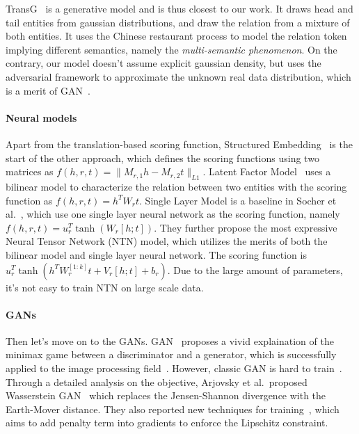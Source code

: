 \documentclass[twocolumn,a4paper,10pt,preprint,3p]{elsarticle}
\begin{document}
TransG~\cite{TransG} is a generative model and is thus closest to our work. It draws head and tail entities from gaussian distributions, and draw the relation from a mixture of both entities. It uses the Chinese restaurant process to model the relation token implying different semantics, namely the \emph{multi-semantic phenomenon}.
On the contrary, our model doesn't assume explicit gaussian density, but uses the adversarial framework to approximate the unknown real data distribution, which is a merit of GAN~\cite{Goodfellow_2016}.

\paragraph{Neural models} Apart from the translation-based scoring function, Structured Embedding~\cite{bordes2011structured_embedding} is the start of the other approach, which defines the scoring functions using two matrices as $f(h, r, t) = \lVert M_{r,1}h - M_{r,2}t \rVert_{L1}$. Latent Factor Model~\cite{jenatton2012bilinear} uses a bilinear model to characterize the relation between two entities with the scoring function as $f(h, r, t) = h^T W_r t$.
Single Layer Model is a baseline in Socher et al.~\cite{NTN}, which use one single layer neural network as the scoring function, namely $f(h, r, t)=u_r^T \tanh(W_r[h;t])$. They further propose the most expressive Neural Tensor Network (NTN) model, which utilizes the merits of both the bilinear model and single layer neural network. The scoring function is $u_r^T \tanh(h^T W_r^{[1:k]}t + V_r[h;t] + b_r)$. Due to the large amount of parameters, it's not easy to train NTN on large scale data.

\paragraph{GANs} Then let's move on to the GANs. GAN~\cite{GAN} proposes a vivid explaination of the minimax game between a discriminator and a generator, which is successfully applied to the image processing field~\cite{Ledig_2017_CVPR}. However, classic GAN is hard to train~\cite{Salimans_2016}. Through a detailed analysis on the objective, Arjovsky et al.\ proposed Wasserstein GAN~\cite{Arjovsky2017WGAN} which replaces the Jensen-Shannon divergence with the Earth-Mover distance. They also reported new techniques for training~\cite{Gulrajani2017LipschitzReg}, which aims to add penalty term into gradients to enforce the Lipschitz constraint.
\end{document}
